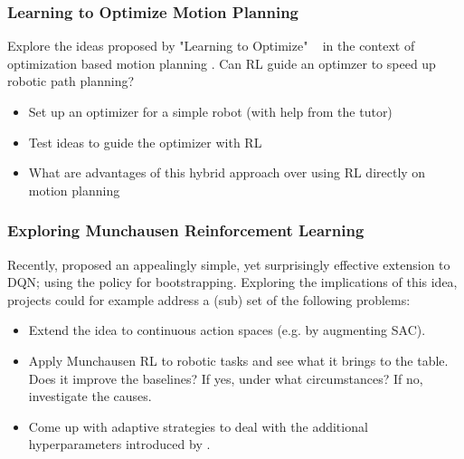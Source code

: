 \documentclass[a4paper]{article}
\begin{document}
\subsubsection{Learning to Optimize Motion Planning}
Explore the ideas proposed by "Learning to Optimize" ~\cite{LiM16b} in the context of optimization based motion planning \cite{Zucker2013}. Can RL guide an optimzer to speed up robotic path planning?
\begin{itemize}
  \item Set up an optimizer for a simple robot (with help from the tutor)
  \item Test ideas to guide the optimizer with RL
  \item What are advantages of this hybrid approach over using RL directly on motion planning
\end{itemize}

\subsubsection{Exploring Munchausen Reinforcement Learning}
Recently, \cite{vieillard2020munchausen} proposed an appealingly simple, yet surprisingly effective extension to DQN; using the policy for bootstrapping. Exploring the implications of this idea, projects could for example address a (sub) set of the following problems:
\begin{itemize}
  \item Extend the idea to continuous action spaces (e.g. by augmenting SAC).
  \item Apply Munchausen RL to robotic tasks and see what it brings to the table. Does it improve the baselines? If yes, under what circumstances? If no, investigate the causes.
  \item Come up with adaptive strategies to deal with the additional hyperparameters introduced by \cite{vieillard2020munchausen}.
\end{itemize}
\end{document}
